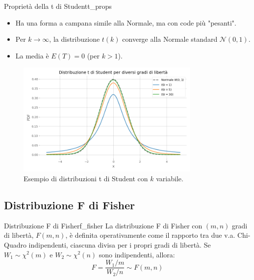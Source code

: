 \begin{proposizione}{Proprietà della t di Student}{t_props}
\begin{itemize}
    \item Ha una forma a campana simile alla Normale, ma con code più "pesanti".
    \item Per \(k \to \infty\), la distribuzione \(t(k)\) converge alla Normale standard \(\mathcal{N}(0,1)\).
    \item La media è \(E(T)=0\) (per \(k>1\)).
\end{itemize}
\end{proposizione}

\begin{figure}[H]
    \centering
    \includegraphics[width=0.8\textwidth]{images/th_01_03/t_student.png}
    \caption{Esempio di distribuzioni t di Student con \(k\) variabile.}
    \label{fig:t_student}
\end{figure}

\subsection{Distribuzione F di Fisher}

\begin{definizione}{Distribuzione F di Fisher}{f_fisher}
La distribuzione F di Fisher con \((m, n)\) gradi di libertà, \(F(m,n)\), è definita operativamente come il rapporto tra due v.a. Chi-Quadro indipendenti, ciascuna divisa per i propri gradi di libertà.
Se \(W_1 \sim \chi^2(m)\) e \(W_2 \sim \chi^2(n)\) sono indipendenti, allora:
\[
F = \frac{W_1/m}{W_2/n} \sim F(m,n) \text{}
\]
\end{definizione}

